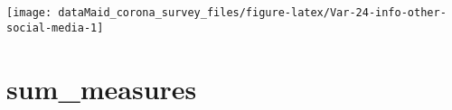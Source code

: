 \documentclass[
]{report}
\begin{document}
\begin{minipage}{0.25 \textwidth}

\begin{center}\texttt{[image: dataMaid\_corona\_survey\_files/figure-latex/Var-24-info-other-social-media-1]} \end{center}

\end{minipage}

\noindent\makebox[\linewidth]{\rule{\textwidth}{0.4pt}}

\hypertarget{sum_measures}{%
\section{sum\_measures}\label{sum_measures}}

\begin{minipage}{0.75 \textwidth}


\end{minipage}
\end{document}
